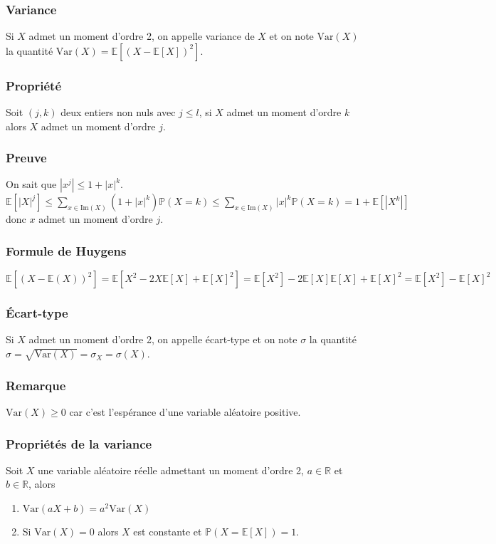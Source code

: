 \documentclass[a4paper,10pt]{book} %
\newcommand{\R}{\mathbb{R}}
\newcommand{\E}{\mathbb{E}} %
\renewcommand{\P}{\mathbb{P}} %
\newcommand\abs[1]{\left|#1\right|}
\newcommand{\Ima}{\mathrm{Im}} %
\newcommand{\Var}{\mathrm{Var}} %
\begin{document}
\subsubsection{Variance}
Si $X$ admet un moment d'ordre 2, on appelle variance de $X$ et on note $\Var(X)$ la quantité $\Var(X)=\E[(X-\E[X])^2]$.

\subsubsection{Propriété}
Soit $(j,k)$ deux entiers non nuls avec $j\leq l$, si $X$ admet un moment d'ordre $k$ alors $X$ admet un moment d'ordre $j$.

\subsubsection{Preuve}
On sait que $\abs{x^j}\leq 1+\abs{x}^k$.\\

$\displaystyle \E[\abs{X}^j]\leq \sum_{x\in\Ima(X)}(1+\abs{x}^k)\P(X=k)\leq \sum_{x\in \Ima(X)}\abs{x}^k\P(X=k)=1+\E[\abs{X^k}]$ donc $x$ admet un moment d'ordre $j$.

\subsubsection{Formule de Huygens}
$\E[(X-\E(X))^2]=\E[X^2-2X\E[X]+\E[X]^2]=\E[X^2]-2\E[X]\E[X]+\E[X]^2=\E[X^2]-\E[X]^2$

\subsubsection{Écart-type}
Si $X$ admet un moment d'ordre 2, on appelle écart-type et on note $\sigma$ la quantité\\$\sigma = \sqrt{\Var(X)}=\sigma_X=\sigma(X)$.

\subsubsection{Remarque}
$\Var(X)\geq 0$ car c'est l'espérance d'une variable aléatoire positive.

\subsubsection{Propriétés de la variance}
Soit $X$ une variable aléatoire réelle admettant un moment d'ordre 2, $a\in \R$ et $b\in \R$, alors
\begin{enumerate}
\item $\Var(aX+b)=a^2\Var(X)$
\item Si $\Var(X)=0$ alors $X$ est constante et $\P(X=\E[X])=1$.
\end{enumerate}
\end{document}
